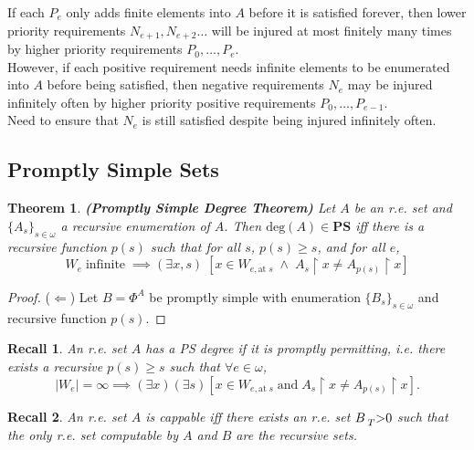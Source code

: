 \documentclass{article}
\newtheorem{theorem}{Theorem}[subsection]
\newtheorem{recall}{Recall}[subsection]
\begin{document}
  If each $P_e$ only adds finite elements into $A$ before it is satisfied
  forever, then lower priority requirements $N_{e+1},N_{e+2}\ldots$ will be
  injured at most finitely many times by higher priority requirements
  $P_0,\ldots,P_e$.\\

  However, if each positive requirement needs infinite elements to be
  enumerated into $A$ before being satisfied, then negative requirements
  $N_e$ may be injured infinitely often by higher priority positive
  requirements $P_0,\ldots,P_{e-1}$.\\

  Need to ensure that $N_e$ is still satisfied despite being injured
  infinitely often.

\subsection{Promptly Simple Sets}
  \begin{theorem}
    \textbf{(Promptly Simple Degree Theorem)} Let $A$ be an r.e. set and
    $\{A_s\}_{s\in\omega}$ a recursive enumeration of $A$. Then
    $\text{deg}(A) \in\bm{PS}$ iff there is a recursive function $p(s)$ such
    that for all $s$, $p(s)\geq s$, and for all $e$,
    \begin{equation}
      W_e\; \text{infinite}\; \implies (\exists x,s)\; [x\in
      W_{e,\text{at}\; s}\; \wedge\; A_s\restriction x \neq
      A_{p(s)}\restriction x]
      \label{eqn:promptly-permit}
    \end{equation}
  \end{theorem}
  \begin{proof}
    ($\Leftarrow$) Let $B=\Phi^A$ be promptly simple with enumeration
    $\{B_s\}_{s\in\omega}$ and recursive function $p(s)$.
  \end{proof}

  \begin{recall}
    An r.e. set $A$ has a PS degree if it is promptly permitting, i.e.
    there exists a recursive $p(s)\geq s$ such that $\forall e\in\omega$,
    \[|W_e|=\infty \implies (\exists x)(\exists s) [x\in W_{e, \text{at}\;
    s}\; \text{and}\; A_s\restriction x \neq A_{p(s)}\restriction x].\]
  \end{recall}

  \begin{recall}
    An r.e. set $A$ is cappable iff there exists an r.e. set
    $B\prescript{}{T}{>}0$ such that the only r.e. set computable by $A$
    and $B$ are the recursive sets.
  \end{recall}
\end{document}
